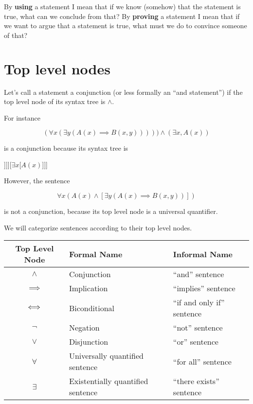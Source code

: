 By \textbf{using} a statement I mean that if we know (somehow) that the statement is true, what can we conclude from that?  By \textbf{proving} a statement I mean that if we want to argue that a statement is true, what must we do to convince someone of that?

 

\section{Top level nodes}

Let's call a statement a conjunction (or less formally an ``and statement'') if the top level node of its syntax tree is $\wedge$.

For instance 

$$
(\forall x (\exists y (A(x) \implies B(x,y))))) \wedge (\exists x, A(x))
$$

is a conjunction because its syntax tree is

\begin{center}
	\begin{forest}	
		[$\wedge$[$\forall x$[$\exists y$[$\implies$[$A(x)$][{$B(x,y)$}]]]][$\exists x$[$A(x)$]]]
		\end{forest}
	\end{center}

However, the sentence

$$
\forall x (A(x) \wedge [\exists y (A(x) \implies B(x,y))])
$$

is not a conjunction, because its top level node is a universal quantifier.

We will categorize sentences according to their top level nodes.


\begin{table}[h]
	\centering
	\begin{tabular}{c|l|l}
	Top Level Node & Formal Name & Informal Name 	\\ \hline
	$\wedge$ & Conjunction & ``and'' sentence\\ \hline
	$\implies$ & Implication & ``implies'' sentence\\ \hline
	$\Longleftrightarrow$ & Biconditional & ``if and only if'' sentence\\ \hline
	$\neg$ & Negation & ``not'' sentence\\ \hline
	$\vee$ & Disjunction & ``or'' sentence\\ \hline
	$\forall$ & Universally quantified sentence & ``for all'' sentence\\ \hline
	$\exists$ & Existentially quantified sentence & ``there exists'' sentence\\ \hline
	\end{tabular}
\end{table}

